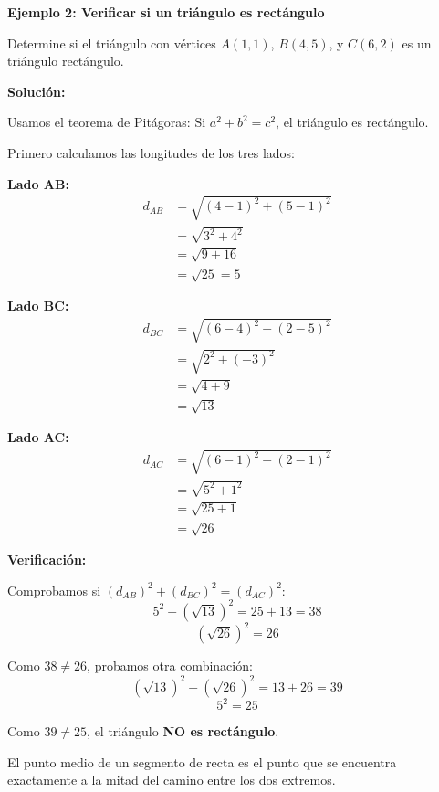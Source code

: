 \begin{example}
\textbf{Ejemplo 2: Verificar si un triángulo es rectángulo}

Determine si el triángulo con vértices $A(1, 1)$, $B(4, 5)$, y $C(6, 2)$ es un triángulo rectángulo.

\textbf{Solución:}

Usamos el teorema de Pitágoras: Si $a^2 + b^2 = c^2$, el triángulo es rectángulo.

Primero calculamos las longitudes de los tres lados:

\textbf{Lado AB:}
\begin{align*}
d_{AB} &= \sqrt{(4-1)^2 + (5-1)^2} \\
       &= \sqrt{3^2 + 4^2} \\
       &= \sqrt{9 + 16} \\
       &= \sqrt{25} = 5
\end{align*}

\textbf{Lado BC:}
\begin{align*}
d_{BC} &= \sqrt{(6-4)^2 + (2-5)^2} \\
       &= \sqrt{2^2 + (-3)^2} \\
       &= \sqrt{4 + 9} \\
       &= \sqrt{13}
\end{align*}

\textbf{Lado AC:}
\begin{align*}
d_{AC} &= \sqrt{(6-1)^2 + (2-1)^2} \\
       &= \sqrt{5^2 + 1^2} \\
       &= \sqrt{25 + 1} \\
       &= \sqrt{26}
\end{align*}

\textbf{Verificación:}

Comprobamos si $(d_{AB})^2 + (d_{BC})^2 = (d_{AC})^2$:
$$5^2 + (\sqrt{13})^2 = 25 + 13 = 38$$
$$(\sqrt{26})^2 = 26$$

Como $38 \neq 26$, probamos otra combinación:
$$(\sqrt{13})^2 + (\sqrt{26})^2 = 13 + 26 = 39$$
$$5^2 = 25$$

Como $39 \neq 25$, el triángulo \textbf{NO es rectángulo}.
\end{example}


El punto medio de un segmento de recta es el punto que se encuentra exactamente a la mitad del camino entre los dos extremos.

